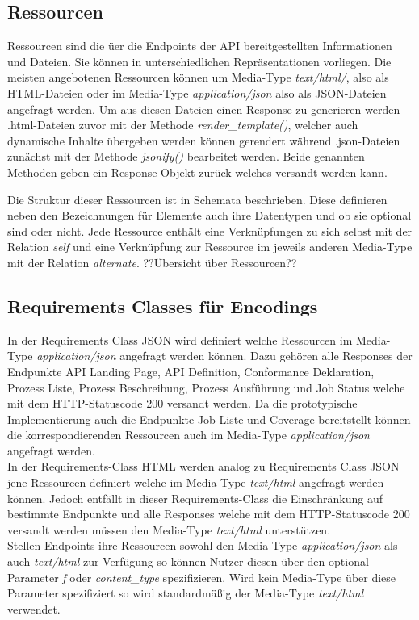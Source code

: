 \subsection{Ressourcen}
Ressourcen sind die üer die Endpoints der API bereitgestellten Informationen und Dateien. Sie können in unterschiedlichen Repräsentationen vorliegen.
Die meisten angebotenen Ressourcen können um Media-Type \textit{text/html/}, also als HTML-Dateien oder im Media-Type \textit{application/json} also als 
JSON-Dateien angefragt werden. Um aus diesen Dateien einen Response zu generieren werden .html-Dateien zuvor mit der Methode \textit{render\_template()}, welcher auch 
dynamische Inhalte übergeben werden können gerendert während .json-Dateien zunächst mit der Methode \textit{jsonify()} bearbeitet werden. Beide genannten Methoden
geben ein Response-Objekt zurück welches versandt werden kann.  

Die Struktur dieser Ressourcen ist in Schemata beschrieben. Diese definieren neben den Bezeichnungen für Elemente auch ihre Datentypen und 
ob sie optional sind oder nicht. Jede Ressource enthält eine Verknüpfungen zu sich selbst mit der Relation \textit{self} und eine Verknüpfung 
zur Ressource im jeweils anderen Media-Type mit der Relation \textit{alternate}. ??Übersicht über Ressourcen??

\subsection{Requirements Classes für Encodings}
In der Requirements Class JSON wird definiert welche Ressourcen im Media-Type \textit{application/json} angefragt werden können. Dazu gehören alle Responses der 
Endpunkte API Landing Page, API Definition, Conformance Deklaration, Prozess Liste, Prozess Beschreibung, Prozess Ausführung und Job Status welche mit dem 
HTTP-Statuscode 200 versandt werden. Da die prototypische Implementierung auch die Endpunkte Job Liste und Coverage bereitstellt können die korrespondierenden
Ressourcen auch im Media-Type \textit{application/json} angefragt werden.\\

In der Requirements-Class HTML werden analog zu Requirements Class JSON jene Ressourcen definiert welche im Media-Type \textit{text/html} angefragt werden können. Jedoch
entfällt in dieser Requirements-Class die Einschränkung auf bestimmte Endpunkte und alle Responses welche mit dem HTTP-Statuscode 200 versandt werden müssen den 
Media-Type \textit{text/html} unterstützen.\\
Stellen Endpoints ihre Ressourcen sowohl den Media-Type \textit{application/json} als auch \textit{text/html} zur Verfügung so können Nutzer diesen über den optional Parameter
\textit{f} oder \textit{content\_type} spezifizieren. Wird kein Media-Type über diese Parameter spezifiziert so wird standardmäßig der Media-Type \textit{text/html} verwendet. \\


